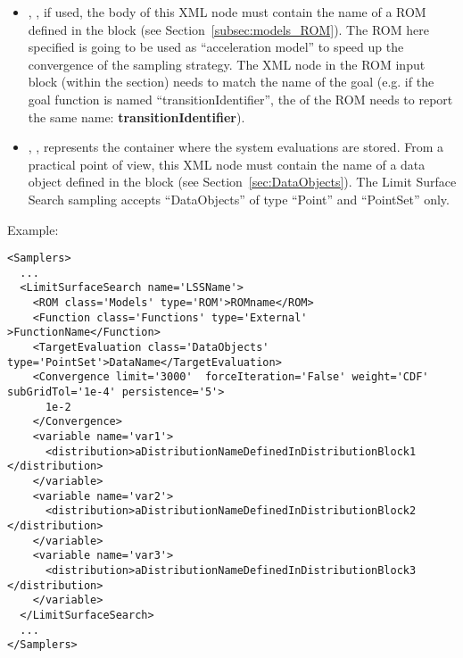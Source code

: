 \begin{itemize}
\begin{itemize}
      \item {}, , if used, the
        body of this XML node must contain the name of a ROM defined in the
         block (see Section~\ref{subsec:models_ROM}). The ROM
        here specified is going to be used as ``acceleration model'' to speed up the
        convergence of the sampling strategy. The  XML node in the ROM
        input block (within the  section) needs to match the name of the goal
         (e.g. if the goal function is named ``transitionIdentifier'', the  of the
        ROM needs to report the same name: \textbf{transitionIdentifier}).
      \item {}, ,
        represents the container where the system evaluations are stored.
        From a practical point of view, this XML node must contain the name of
        a data object defined in the  block (see
        Section~\ref{sec:DataObjects}).
        The Limit Surface Search sampling accepts ``DataObjects'' of type ``Point'' and
        ``PointSet'' only.
    \end{itemize}
\end{itemize}

Example:
\begin{lstlisting}[style=XML,morekeywords={class,limit,subGridTol,weight,persistence}]
<Samplers>
  ...
  <LimitSurfaceSearch name='LSSName'>
    <ROM class='Models' type='ROM'>ROMname</ROM>
    <Function class='Functions' type='External' >FunctionName</Function>
    <TargetEvaluation class='DataObjects' type='PointSet'>DataName</TargetEvaluation>
    <Convergence limit='3000'  forceIteration='False' weight='CDF'  subGridTol='1e-4' persistence='5'>
      1e-2
    </Convergence>
    <variable name='var1'>
      <distribution>aDistributionNameDefinedInDistributionBlock1 </distribution>
    </variable>
    <variable name='var2'>
      <distribution>aDistributionNameDefinedInDistributionBlock2 </distribution>
    </variable>
    <variable name='var3'>
      <distribution>aDistributionNameDefinedInDistributionBlock3 </distribution>
    </variable>
  </LimitSurfaceSearch>
  ...
</Samplers>
\end{lstlisting}

